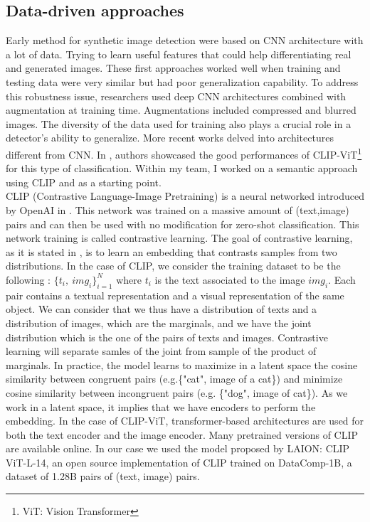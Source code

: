 \documentclass[12pt,a4paper]{article}
\begin{document}
\subsection{Data-driven approaches}
Early method for synthetic image detection were based on CNN architecture with a lot of data. Trying to learn useful features that could help differentiating real and generated images. These first approaches worked well when training and testing data were very similar but had poor generalization capability. To address this robustness issue, researchers used deep CNN architectures combined with augmentation at training time. Augmentations included compressed and blurred images. The diversity of the data used for training also plays a crucial role in a detector's ability to generalize. More recent works delved into architectures different from CNN. In \autocite*{cozzolinoRaisingBarAIgenerated2024}, authors showcased the good performances of CLIP-ViT\footnote{ViT: Vision Transformer} for this type of classification. Within my team, I worked on a semantic approach using CLIP and \autocite*{cozzolinoRaisingBarAIgenerated2024} as a starting point.\\
CLIP (Contrastive Language-Image Pretraining) is a neural networked introduced by OpenAI in \autocite*{radfordLearningTransferableVisual2021}. This network was trained on a massive amount of (text,image) pairs and can then be used with no modification for zero-shot classification. This network training is called contrastive learning. The goal of contrastive learning, as it is stated in \autocite*{tianContrastiveMultiviewCoding2020}, is to learn an embedding that contrasts samples from two distributions. In the case of CLIP, we consider the training dataset to be the following : $\{t_i,\ img_i\}_{i=1}^N$ where $t_i$ is the text associated to the image $img_i$. Each pair contains a textual representation and a visual representation of the same object. We can consider that we thus have a distribution of texts and a distribution of images, which are the marginals, and we have the joint distribution which is the one of the pairs of texts and images. Contrastive learning will separate samles of the joint from sample of the product of marginals. In practice, the model learns to maximize in a latent space the cosine similarity between congruent pairs (e.g.\{"cat", image of a cat\}) and minimize cosine similarity between incongruent pairs (e.g. \{"dog", image of cat\}). As we work in a latent space, it implies that we have encoders to perform the embedding. In the case of CLIP-ViT, transformer-based architectures are used for both the text encoder and the image encoder. Many pretrained versions of CLIP are available online. In our case we used the model proposed by LAION: CLIP ViT-L-14, an open source implementation of CLIP trained on DataComp-1B, a dataset of 1.28B pairs of (text, image) pairs.
\end{document}
